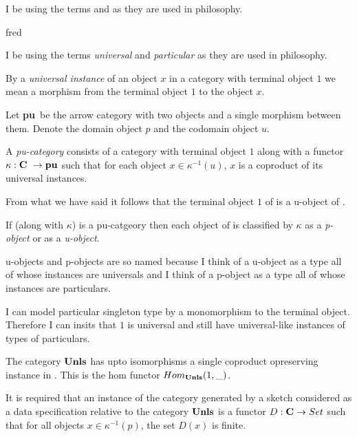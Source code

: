 \documentclass[10pt,a4paper]{article}
\theoremstyle{remark}
\begin{document}
I be using the terms  and  as they are used in philosophy.

\begin{aside}
fred
\end{aside}


\begin{aside}
\newcommand{\puarrowcat}{\textbf{pu}}
I be using the terms \textit{universal} and \textit{particular} as they are used in philosophy.

By a \textit{universal instance} of an object $x$ in a category 
with terminal object $1$ we mean a morphism from the terminal object $1$ to the object $x$.

Let \puarrowcat\  be the arrow category with two objects and a single morphism between them.
Denote the domain object $p$ and  the codomain object $u$.

A \textit{pu-category} consists of a category \catcw with terminal object $1$ 
along with  a functor $\kappa: \catcw \morph \puarrowcat$ 
such that for each object $x \in \kappa^{-1}(u)$, $x$ is a coproduct of its universal instances.

From what we have said it follows that the terminal object $1$ of \catcw is a u-object of \catc.

If \catcw (along with $\kappa$) is a pu-catgeory then each object of \catcw is
classified by $\kappa$  as a \textit{p-object} or as a \textit{u-object}. 

u-objects and p-objects are so named because I
think of a u-object as a type all of whose instances are universals and I think of a p-object as a type
all of whose instances are particulars. 
\end{aside}

\begin{newtt}
I can model particular singleton type by a monomorphism to the terminal object. Therefore
I can insits that $1$ is universal and still have universal-like instances of types of particulars.
\end{newtt}

The category $\textbf{Unls}$ has upto isomorphisms a single coproduct opreserving instance in \Set. 
This is the hom functor $Hom_{\textbf{Unls}}(1,\_)$.

It is required that an instance of the category \catcw  generated by a sketch considered as a data specification relative to  the category $\textbf{Unls}$ is a functor $D: \textbf{C} \rightarrow Set$ such
that for all objects $x \in \kappa^{-1}(p)$, the set $D(x)$ is finite.
\end{document}
